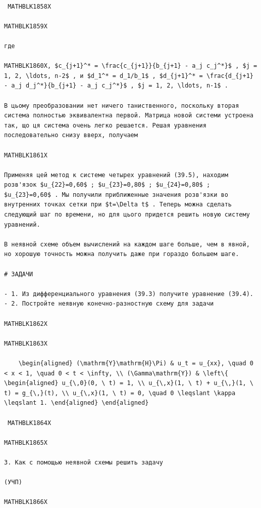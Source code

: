 \documentclass[
  ukrainian,
]{article}
\begin{document}
\begin{verbatim}

 MATHBLK1858X

MATHBLK1859X

где 

MATHBLK1860X, $c_{j+1}^* = \frac{c_{j+1}}{b_{j+1} - a_j c_j^*}$ , $j = 1, 2, \ldots, n-2$ , и $d_1^* = d_1/b_1$ , $d_{j+1}^* = \frac{d_{j+1} - a_j d_j^*}{b_{j+1} - a_j c_j^*}$ , $j = 1, 2, \ldots, n-1$ .

В цьому преобразовании нет ничего таниственного, поскольку вторая система полностью эквивалентна первой. Матрица новой системи устроена так, що ця система очень легко решается. Решая уравнения последовательно снизу вверх, получаем

MATHBLK1861X

Применяя цей метод к системе четырех уравнений (39.5), находим розв'язок $u_{22}=0,60$ ; $u_{23}=0,80$ ; $u_{24}=0,80$ ; $u_{23}=0,60$ . Мы получили приближенные значения розв'язки во внутренних точках сетки при $t=\Delta t$ . Теперь можна сделать следующий шаг по времени, но для цього придется решить новую систему уравнений.

В неявной схеме объем вычислений на каждом шаге больше, чем в явной, но хорошую точность можна получить даже при гораздо большем шаге.

# ЗАДАЧИ

- 1. Из дифференциального уравнения (39.3) получите уравнение (39.4).
- 2. Постройте неявную конечно-разностную схему для задачи

MATHBLK1862X

MATHBLK1863X

    \begin{aligned} (\mathrm{Y}\mathrm{H}\Pi) & u_t = u_{xx}, \quad 0 < x < 1, \quad 0 < t < \infty, \\ (\Gamma\mathrm{Y}) & \left\{ \begin{aligned} u_{\,0}(0, \ t) = 1, \\ u_{\,x}(1, \ t) + u_{\,}(1, \ t) = g_{\,}(t), \\ u_{\,x}(1, \ t) = 0, \quad 0 \leqslant \kappa \leqslant 1. \end{aligned} \end{aligned}

 MATHBLK1864X

MATHBLK1865X

3. Как с помощью неявной схемы решить задачу

(УЧП) 

MATHBLK1866X


\end{verbatim}
\end{document}

